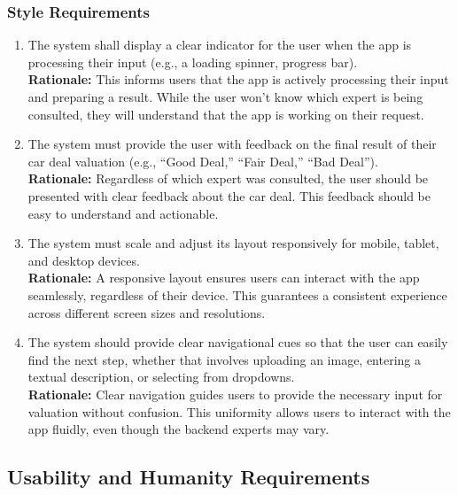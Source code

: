 \documentclass[]{article}
\begin{document}
\subsubsection{Style Requirements}
\label{ssub:style_requirements}
\begin{enumerate}[{LF-S}1.]
    \item The system shall display a clear indicator for the user when the app is processing their input (e.g., a loading spinner, progress bar). \\
    \textbf{Rationale:} This informs users that the app is actively processing their input and preparing a result. While the user won't know which expert is being consulted, they will understand that the app is working on their request.
    
    \item The system must provide the user with feedback on the final result of their car deal valuation (e.g., “Good Deal,” “Fair Deal,” “Bad Deal”).  \\
    \textbf{Rationale:} Regardless of which expert was consulted, the user should be presented with clear feedback about the car deal. This feedback should be easy to understand and actionable.

    \item  The system must scale and adjust its layout responsively for mobile, tablet, and desktop devices.  \\
    \textbf{Rationale:} A responsive layout ensures users can interact with the app seamlessly, regardless of their device. This guarantees a consistent experience across different screen sizes and resolutions.

    \item The system should provide clear navigational cues so that the user can easily find the next step, whether that involves uploading an image, entering a textual description, or selecting from dropdowns.  \\
    \textbf{Rationale:} Clear navigation guides users to provide the necessary input for valuation without confusion. This uniformity allows users to interact with the app fluidly, even though the backend experts may vary.
\end{enumerate}

\subsection{Usability and Humanity Requirements}
\label{sub:usability_and_humanity_requirements}
\end{document}
